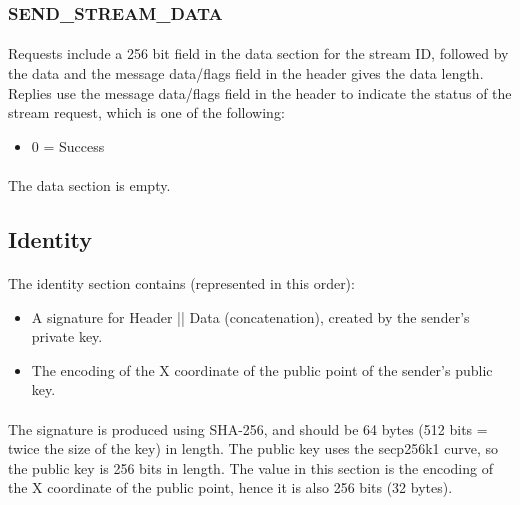 \documentclass{article}
\begin{document}
\subsubsection{SEND\_STREAM\_DATA}

\paragraph{}
Requests include a 256 bit field in the data section for the stream ID, followed by the data and the message data/flags field in the header gives the data length.
Replies use the message data/flags field in the header to indicate the status of the stream request, which is one of the following:

\begin{itemize}
\item 0 = Success
\end{itemize}

\paragraph{}
The data section is empty.

\subsection{Identity}

\paragraph{}
The identity section contains (represented in this order):

\begin{itemize}
\item A signature for {Header || Data} (concatenation), created by the sender's private key.
\item The encoding of the X coordinate of the public point of the sender's public key.
\end{itemize}

\paragraph{}
The signature is produced using SHA-256, and should be 64 bytes (512 bits = twice the size of the key) in length. The public key uses the secp256k1 curve, so the public key is 256 bits in length. The value in this section is the encoding of the X coordinate of the public point, hence it is also 256 bits (32 bytes).
\end{document}
